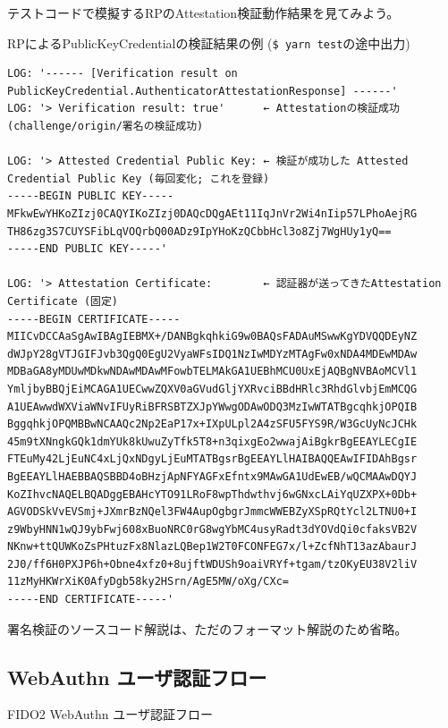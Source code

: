 \documentclass[12pt,dvipdfmx,uplatex]{beamer}
\begin{document}
\begin{frame}[fragile]
\small
テストコードで模擬するRPのAttestation検証動作結果を見てみよう。
\begin{exampleblock}{\scriptsize RPによるPublicKeyCredentialの検証結果の例 (\texttt{\$ yarn test}の途中出力)}
\tiny
 \begin{verbatim}
LOG: '------ [Verification result on PublicKeyCredential.AuthenticatorAttestationResponse] ------'
LOG: '> Verification result: true'      ← Attestationの検証成功 (challenge/origin/署名の検証成功)

LOG: '> Attested Credential Public Key: ← 検証が成功した Attested Credential Public Key (毎回変化; これを登録)
-----BEGIN PUBLIC KEY-----
MFkwEwYHKoZIzj0CAQYIKoZIzj0DAQcDQgAEt11IqJnVr2Wi4nIip57LPhoAejRG
TH86zg3S7CUYSFibLqVOQrbQ00ADz9IpYHoKzQCbbHcl3o8Zj7WgHUy1yQ==
-----END PUBLIC KEY-----'

LOG: '> Attestation Certificate:        ← 認証器が送ってきたAttestation Certificate (固定)
-----BEGIN CERTIFICATE-----
MIICvDCCAaSgAwIBAgIEBMX+/DANBgkqhkiG9w0BAQsFADAuMSwwKgYDVQQDEyNZ
dWJpY28gVTJGIFJvb3QgQ0EgU2VyaWFsIDQ1NzIwMDYzMTAgFw0xNDA4MDEwMDAw
MDBaGA8yMDUwMDkwNDAwMDAwMFowbTELMAkGA1UEBhMCU0UxEjAQBgNVBAoMCVl1
YmljbyBBQjEiMCAGA1UECwwZQXV0aGVudGljYXRvciBBdHRlc3RhdGlvbjEmMCQG
A1UEAwwdWXViaWNvIFUyRiBFRSBTZXJpYWwgODAwODQ3MzIwWTATBgcqhkjOPQIB
BggqhkjOPQMBBwNCAAQc2Np2EaP17x+IXpULpl2A4zSFU5FYS9R/W3GcUyNcJCHk
45m9tXNngkGQk1dmYUk8kUwuZyTfk5T8+n3qixgEo2wwajAiBgkrBgEEAYLECgIE
FTEuMy42LjEuNC4xLjQxNDgyLjEuMTATBgsrBgEEAYLlHAIBAQQEAwIFIDAhBgsr
BgEEAYLlHAEBBAQSBBD4oBHzjApNFYAGFxEfntx9MAwGA1UdEwEB/wQCMAAwDQYJ
KoZIhvcNAQELBQADggEBAHcYTO91LRoF8wpThdwthvj6wGNxcLAiYqUZXPX+0Db+
AGVODSkVvEVSmj+JXmrBzNQel3FW4AupOgbgrJmmcWWEBZyXSpRQtYcl2LTNU0+I
z9WbyHNN1wQJ9ybFwj608xBuoNRC0rG8wgYbMC4usyRadt3dYOVdQi0cfaksVB2V
NKnw+ttQUWKoZsPHtuzFx8NlazLQBep1W2T0FCONFEG7x/l+ZcfNhT13azAbaurJ
2J0/ff6H0PXJP6h+Obne4xfz0+8ujftWDUSh9oaiVRYf+tgam/tzOKyEU38V2liV
11zMyHKWrXiK0AfyDgb58ky2HSrn/AgE5MW/oXg/CXc=
-----END CERTIFICATE-----'
\end{verbatim}
\end{exampleblock}
署名検証のソースコード解説は、ただのフォーマット解説のため省略。
\end{frame}


\subsection{WebAuthn ユーザ認証フロー}

\begin{frame}
\centering
{\Large FIDO2 WebAuthn ユーザ認証フロー}
\end{frame}
\end{document}
